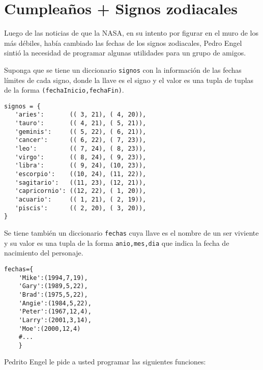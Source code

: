\section{Cumpleaños + Signos zodiacales}
Luego de las noticias de que la NASA, en su intento por figurar en el muro de los más débiles, había cambiado las fechas de los signos zodiacales, Pedro Engel sintió la necesidad de programar algunas utilidades para un grupo de amigos.

Suponga que se tiene un diccionario \texttt{signos} con la información de las fechas límites de cada signo, donde la llave es el signo y el valor es una tupla de tuplas de la forma \texttt{(fechaInicio,fechaFin)}.
\begin{lstlisting}[style=consola]
signos = {
   'aries':       (( 3, 21), ( 4, 20)),
   'tauro':       (( 4, 21), ( 5, 21)),
   'geminis':     (( 5, 22), ( 6, 21)),
   'cancer':      (( 6, 22), ( 7, 23)),
   'leo':         (( 7, 24), ( 8, 23)),
   'virgo':       (( 8, 24), ( 9, 23)),
   'libra':       (( 9, 24), (10, 23)),
   'escorpio':    ((10, 24), (11, 22)),
   'sagitario':   ((11, 23), (12, 21)),
   'capricornio': ((12, 22), ( 1, 20)),
   'acuario':     (( 1, 21), ( 2, 19)),
   'piscis':      (( 2, 20), ( 3, 20)),
}
\end{lstlisting}
Se tiene también un diccionario \texttt{fechas} cuya llave es el nombre de un ser viviente y su valor es una tupla de la forma \texttt{anio,mes,dia} que indica la fecha de nacimiento del personaje.

\begin{lstlisting}[style=consola]
fechas={
    'Mike':(1994,7,19),
    'Gary':(1989,5,22),
    'Brad':(1975,5,22),
    'Angie':(1984,5,22),
    'Peter':(1967,12,4),
    'Larry':(2001,3,14),
    'Moe':(2000,12,4)
    #...
    }
\end{lstlisting}

Pedrito Engel le pide a usted programar las siguientes funciones:

